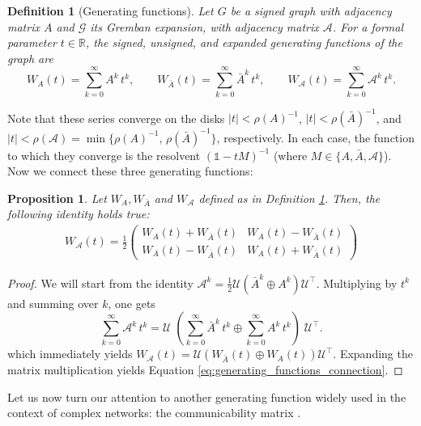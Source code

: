 \documentclass[reprint,onecolumn]{article}
\newtheorem{definition}[theorem]{Definition}  %
\newtheorem{proposition}[theorem]{Proposition}
\newcommand{\mc}[1]{\mathcal{#1}}
\newcommand{\R}{\mathbb{R}}
\newcommand{\1}{\mathbb{1}}
\newcommand{\0}{\mathbf{0}}
\begin{document}
\begin{definition}[Generating functions] \label{def:generating_function}
    Let $G$ be a signed graph with adjacency matrix \(A\) and $\mc G$ its Gremban expansion, with adjacency matrix $\mc A$.  For a formal parameter \(t\in \R\), the \emph{signed, unsigned, and expanded generating functions} of the graph are
\[
W_A(t)=\sum_{k=0}^\infty A^k\,t^k,\qquad
W_{\bar A}(t)=\sum_{k=0}^\infty  \bar A^k\,t^k,\qquad
W_{\mc A}(t)=\sum_{k=0}^\infty \mc A^k\,t^k.
\]
\end{definition}
Note that these series converge on the disks $|t|<\rho(A)^{-1}$, $|t|<\rho(\bar A)^{-1}$, and $|t|<\rho(\mc A)= \min\{\rho(A)^{-1},\,\rho(\bar A)^{-1}\}$, respectively. In each case, the function to which they converge is the resolvent $(\1-tM)^{-1}$ (where $M \in\{A, \bar A, \mc A\}$).
Now we connect these three generating functions:

\begin{proposition} \label{prop:generating_functions_connection}
Let $W_A, W_{\bar A}$ and $W_\mc A$ defined as in Definition \ref{def:generating_function}. Then, the following identity holds true:
\begin{align} \label{eq:generating_functions_connection}
    W_\mc A(t) = \frac1{2} \begin{pmatrix}
        W_A(t)+W_{\bar A}(t) &  W_A(t)-W_{\bar A}(t) \\
       W_A(t)-W_{\bar A}(t) &  W_A(t)+W_{\bar A}(t)
    \end{pmatrix}
\end{align} 
\end{proposition}

\begin{proof}
We will start from the identity 
\(\mc A^k=\frac12 \mc U(\bar A^k \oplus A^k) \mc U^\top\). Multiplying by $t^k$ and summing over $k$, one gets
\[
\sum_{k=0}^\infty \mc A^k\,t^k = \mc U \;\left(\sum_{k=0}^\infty  \bar A^k\,t^k \oplus
\sum_{k=0}^\infty A^k\,t^k\right) \; \mc U^\top.
\]
which immediately yields \(W_\mc A(t)= \mathcal{U} (W_{\bar A}(t) \oplus W_A(t))\mathcal{U}^\top\). Expanding the matrix multiplication yields Equation \eqref{eq:generating_functions_connection}.
\end{proof}
Let us now turn our attention to another  generating function widely used in the context of complex networks: the communicability matrix \cite{estrada2008communicability,diaz2025signed}.
\end{document}
